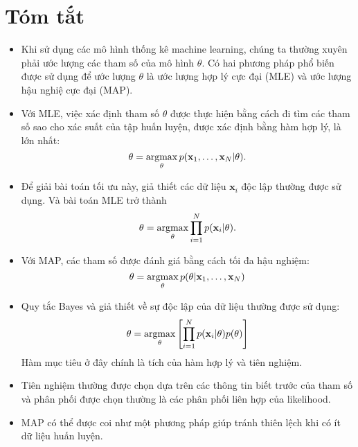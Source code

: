 \section{Tóm tắt}
\begin{itemize}
\item Khi sử dụng các mô hình thống kê machine learning, chúng ta thường
xuyên phải ước lượng các tham số của mô hình $\theta$. Có hai phương pháp phổ biến được sử dụng để
ước lượng $\theta$ là ước lượng hợp lý cực đại (MLE) và ước lượng hậu nghiệ cực đại (MAP).

\item Với MLE, việc xác định tham số $\theta$ được thực hiện bằng cách đi
tìm các tham số sao cho xác suất của tập huấn luyện, được xác định bằng
hàm {hợp lý}, là lớn nhất:
\begin{equation}
\theta = \operatorname*{argmax}_{\theta} p(\mathbf{x}_1, \dots, \mathbf{x}_N |\theta).
\end{equation}

\item Để giải bài toán tối ưu này, giả thiết các dữ liệu $\mathbf{x}_i$ độc lập thường được sử dụng. Và bài toán MLE trở thành
\begin{equation}
\theta = \operatorname*{argmax}_{\theta} \prod_{i=1}^N p(\mathbf{x}_i | \theta).
\end{equation}

\item Với MAP, các tham số được đánh giá bằng cách tối đa {hậu nghiệm}:
\begin{equation}
\theta = \operatorname*{argmax}_{\theta} p(\theta | \mathbf{x}_1, \dots, \mathbf{x}_N)
\end{equation}
\item Quy tắc Bayes và giả thiết về sự độc lập của dữ
liệu thường được sử dụng:
\begin{equation} \theta = \operatorname*{argmax}_{\theta}
\left[\prod_{i=1}^N p(\mathbf{x}_i | \theta) p(\theta) \right]
\end{equation}
Hàm mục tiêu ở đây chính là tích của {hàm hợp lý} và tiên nghiệm.


\item Tiên nghiệm thường được chọn dựa trên các thông tin biết trước của
tham số và phân phối được chọn thường là các phân phối liên hợp của likelihood.

\item MAP có thể được coi như một phương pháp giúp tránh thiên lệch khi có
ít dữ liệu huấn luyện.

\end{itemize}





